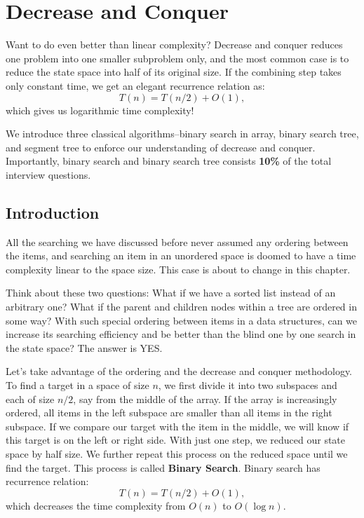 \documentclass[main.tex]{subfiles}
\begin{document}
\chapter{Decrease and Conquer}
Want to do even better than  linear complexity? Decrease and conquer reduces one problem into one smaller subproblem only, and the most common case is to reduce the state space into half of its original size. If the combining step takes only constant time, we get an elegant recurrence relation as:
\begin{equation}
    T(n) = T(n/2) + O(1),
\end{equation}
which gives us logarithmic time complexity!

We introduce three classical algorithms--binary search in array, binary search tree, and segment tree to enforce our understanding of decrease and conquer. Importantly, binary search and binary search tree consists \textbf{10\%} of the total interview questions. 
\section{Introduction}
All the searching we have discussed before never assumed any ordering between the items, and searching an item in an unordered space is doomed to have a time complexity linear to the space size. This case is about to change in this chapter. 

Think about these two questions: What if we have a sorted list instead of an arbitrary one? What if the parent and children nodes within a tree are ordered in some way? With such special ordering between items in a data structures, can we increase its searching efficiency and be better than the blind one by one search in the state space? The answer is YES.

Let's take advantage of the ordering and the decrease and conquer methodology. To find a target in a space of size $n$, we first divide it into two subspaces and each of size $n/2$, say from the middle of the array. If the array is increasingly ordered, all items in the left subspace are smaller than all items in the right subspace. If we compare our target with the item in the middle, we will know if this target is on the left or right side. With just one step, we reduced our state space by half size. We further repeat this process on the reduced space until we find the target. This process is called \textbf{Binary Search}. Binary search has recurrence relation:
\begin{equation}
   T(n) = T(n/2) + O(1) ,
\end{equation}
which decreases the time complexity from $O(n)$ to $O(\log n)$.
\end{document}
